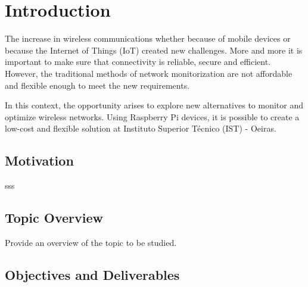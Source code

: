 
\chapter{Introduction}
\label{chapter:introduction}

The increase in wireless communications whether because of mobile devices 
or because the Internet of Things (IoT) created new challenges. 
More and more it is important to make sure that connectivity is reliable,
secure and efficient.
However, the traditional methods of network monitorization are not affordable
and flexible enough to meet the new requirements.

In this context, the opportunity arises to explore new alternatives to
monitor and optimize wireless networks. Using Raspberry Pi devices, 
it is possible to create a low-cost and flexible solution at 
Instituto Superior T\'ecnico (IST) - Oeiras.


\section{Motivation}
\label{section:motivation}

sss

\section{Topic Overview}
\label{section:overview}

Provide an overview of the topic to be studied.


\section{Objectives and Deliverables}
\label{section:objectives}

